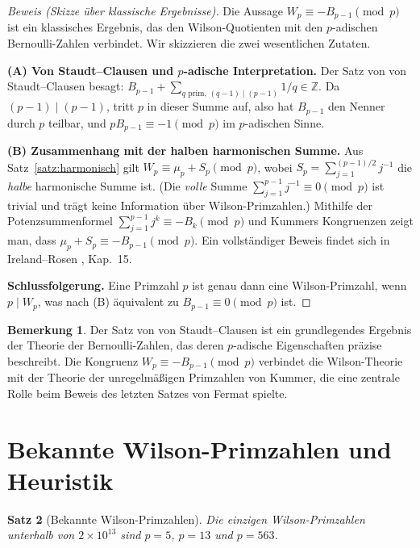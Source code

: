 \documentclass[12pt,a4paper]{amsart}
\newtheorem{theorem}{Satz}[section]
\theoremstyle{definition}
\newtheorem{bemerkung}[theorem]{Bemerkung}
\newcommand{\Z}{\mathbb{Z}}
\begin{document}
\begin{proof}[Beweis (Skizze über klassische Ergebnisse)]
  Die Aussage $W_p \equiv -B_{p-1} \pmod{p}$ ist ein klassisches Ergebnis,
  das den Wilson-Quotienten mit den $p$-adischen Bernoulli-Zahlen verbindet.
  Wir skizzieren die zwei wesentlichen Zutaten.

  \textbf{(A) Von Staudt--Clausen und $p$-adische Interpretation.}
  Der Satz von von Staudt--Clausen besagt:
  $B_{p-1} + \sum_{q\text{ prim},\,(q-1)\mid(p-1)} 1/q \in \Z$.
  Da $(p-1) \mid (p-1)$, tritt $p$ in dieser Summe auf, also hat $B_{p-1}$ den
  Nenner durch $p$ teilbar, und $pB_{p-1} \equiv -1 \pmod{p}$ im $p$-adischen Sinne.

  \textbf{(B) Zusammenhang mit der halben harmonischen Summe.}
  Aus Satz~\ref{satz:harmonisch} gilt $W_p \equiv \mu_p + S_p \pmod{p}$, wobei
  $S_p = \sum_{j=1}^{(p-1)/2} j^{-1}$ die \emph{halbe} harmonische Summe ist.
  (Die \emph{volle} Summe $\sum_{j=1}^{p-1} j^{-1} \equiv 0 \pmod{p}$ ist trivial
  und trägt keine Information über Wilson-Primzahlen.)
  Mithilfe der Potenzsummenformel $\sum_{j=1}^{p-1} j^k \equiv -B_k \pmod{p}$
  und Kummers Kongruenzen zeigt man, dass $\mu_p + S_p \equiv -B_{p-1} \pmod{p}$.
  Ein vollständiger Beweis findet sich in Ireland--Rosen \cite{Ireland1990}, Kap.~15.

  \textbf{Schlussfolgerung.}
  Eine Primzahl $p$ ist genau dann eine Wilson-Primzahl, wenn $p \mid W_p$,
  was nach (B) äquivalent zu $B_{p-1} \equiv 0 \pmod{p}$ ist.
\end{proof}

\begin{bemerkung}
  Der Satz von von Staudt--Clausen ist ein grundlegendes Ergebnis der
  Theorie der Bernoulli-Zahlen, das deren $p$-adische Eigenschaften präzise
  beschreibt. Die Kongruenz $W_p \equiv -B_{p-1} \pmod{p}$ verbindet die
  Wilson-Theorie mit der Theorie der unregelmäßigen Primzahlen von Kummer,
  die eine zentrale Rolle beim Beweis des letzten Satzes von Fermat spielte.
\end{bemerkung}

\section{Bekannte Wilson-Primzahlen und Heuristik}

\begin{theorem}[Bekannte Wilson-Primzahlen]\label{satz:bekannte_wilson}
  Die einzigen Wilson-Primzahlen unterhalb von $2 \times 10^{13}$ sind
  $p = 5$, $p = 13$ und $p = 563$.
\end{theorem}
\end{document}
